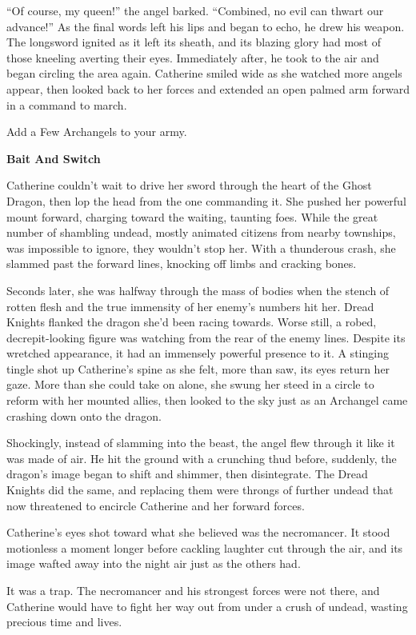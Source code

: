 \begin{multicols*}{2}
``Of course, my queen!'' the angel barked.
``Combined, no evil can thwart our advance!'' As the final words left his lips and began to echo, he drew his weapon.
The longsword ignited as it left its sheath, and its blazing glory had most of those kneeling averting their eyes.
Immediately after, he took to the air and began circling the area again.
Catherine smiled wide as she watched more angels appear, then looked back to her forces and extended an open palmed arm forward in a command to march.

\textcolor{darkcandyapplered}{Add a Few Archangels to your army.}

\textbf{Bait And Switch}

Catherine couldn't wait to drive her sword through the heart of the Ghost Dragon, then lop the head from the one commanding it.
She pushed her powerful mount forward, charging toward the waiting, taunting foes.
While the great number of shambling undead, mostly animated citizens from nearby townships, was impossible to ignore, they wouldn't stop her.
With a thunderous crash, she slammed past the forward lines, knocking off limbs and cracking bones.

Seconds later, she was halfway through the mass of bodies when the stench of rotten flesh and the true immensity of her enemy's numbers hit her.
Dread Knights flanked the dragon she'd been racing towards.
Worse still, a robed, decrepit-looking figure was watching from the rear of the enemy lines.
Despite its wretched appearance, it had an immensely powerful presence to it.
A stinging tingle shot up Catherine's spine as she felt, more than saw, its eyes return her gaze.
More than she could take on alone, she swung her steed in a circle to reform with her mounted allies, then looked to the sky just as an Archangel came crashing down onto the dragon.

Shockingly, instead of slamming into the beast, the angel flew through it like it was made of air.
He hit the ground with a crunching thud before, suddenly, the dragon's image began to shift and shimmer, then disintegrate.
The Dread Knights did the same, and replacing them were throngs of further undead that now threatened to encircle Catherine and her forward forces.

Catherine's eyes shot toward what she believed was the necromancer.
It stood motionless a moment longer before cackling laughter cut through the air, and its image wafted away into the night air just as the others had.

It was a trap.
The necromancer and his strongest forces were not there, and Catherine would have to fight her way out from under a crush of undead, wasting precious time and lives.


\end{multicols*}
